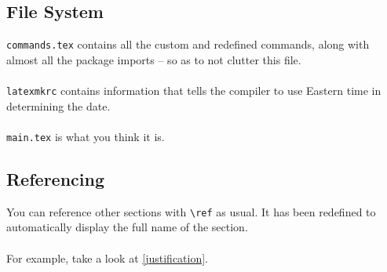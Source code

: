 \documentclass[12pt]{article}
\begin{document}
\subsection{File System}
\verb|commands.tex| contains all the custom and redefined commands, along with almost all the package imports -- so as to not clutter this file.
\\\\
\verb|latexmkrc| contains information that tells the compiler to use Eastern time in determining the date.
\\\\
\verb|main.tex| is what you think it is.

\subsection{Referencing}
You can reference other sections with \verb|\ref| as usual.
It has been redefined to automatically display the full name of the section.
\\\\
For example, take a look at \ref{justification}.
\end{document}
